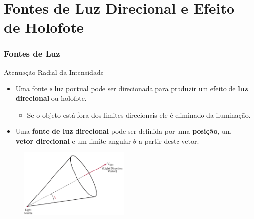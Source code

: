 \documentclass{beamer}
\begin{document}
\section{Fontes de Luz Direcional e Efeito de Holofote}
\begin{frame}
\frametitle{Fontes de Luz}

	\begin{block}{Atenuação Radial da Intensidade}
		\begin{itemize}
			\item Uma fonte e luz pontual pode ser direcionada para produzir um efeito de \textbf{luz direcional} ou holofote.
			\begin{itemize}
				\item Se o objeto está fora dos limites direcionais ele é eliminado da iluminação.
			\end{itemize}
			\item Uma \textbf{fonte de luz direcional} pode ser definida por uma \textbf{posição}, um \textbf{vetor direcional} e um limite angular $\theta$ a partir deste vetor.				 
		\end{itemize}
	\end{block}

	\begin{figure}[!h]
			\begin{center}
			\includegraphics[width=0.48\textwidth]{Figures/Hol}
			\end{center}
	\end{figure}	
	
\end{frame}

\end{document}

